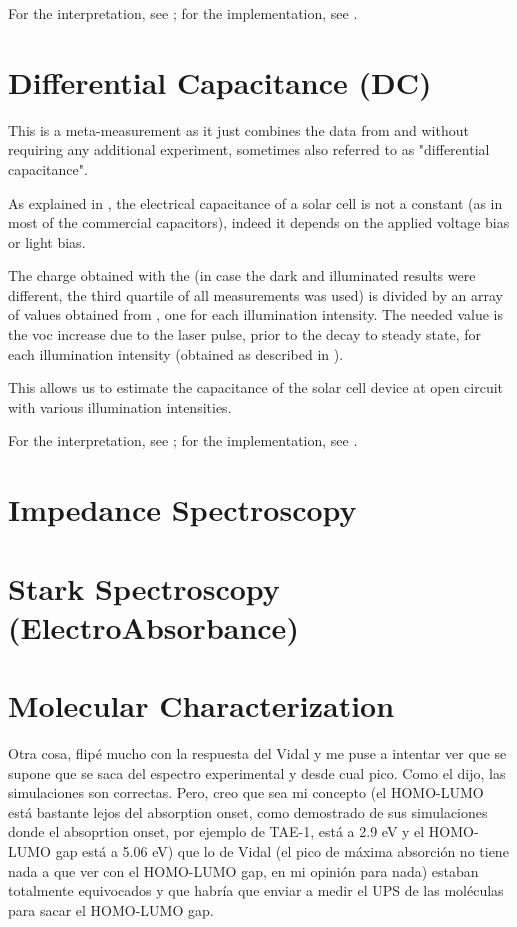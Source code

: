 For the interpretation, see ; for the implementation, see .

\section{Differential Capacitance (DC)}

This is a meta-measurement as it just combines the data from  and  without requiring any additional experiment\cite{Shuttle2008}, sometimes also referred to as "differential capacitance".

As explained in , the electrical capacitance of a solar cell is not a constant (as in most of the commercial capacitors), indeed it depends on the applied voltage bias or light bias.

The charge obtained with the  (in case the dark and illuminated results were different, the third quartile of all  measurements was used) is divided by an array of values obtained from , one for each illumination intensity. The needed value is the \gls{voc} increase due to the laser pulse, prior to the decay to steady state, for each illumination intensity (obtained as described in ).

This allows us to estimate the capacitance of the solar cell device at open circuit with various illumination intensities.

For the interpretation, see ; for the implementation, see .

\section{Impedance Spectroscopy}

\section{Stark Spectroscopy (ElectroAbsorbance)}

\section{Molecular Characterization}

Otra cosa, flipé mucho con la respuesta del Vidal y me puse a intentar
ver que se supone que se saca del espectro experimental y desde cual
pico. Como el dijo, las simulaciones son correctas.
Pero, creo que sea mi concepto (el HOMO-LUMO está bastante lejos del
absorption onset, como demostrado de sus simulaciones donde el
absoprtion onset, por ejemplo de TAE-1, está a 2.9 eV y el HOMO-LUMO gap
está a 5.06 eV) que lo de Vidal (el pico de máxima absorción no tiene
nada a que ver con el HOMO-LUMO gap, en mi opinión para nada) estaban
totalmente equivocados y que habría que enviar a medir el UPS de las
moléculas para sacar el HOMO-LUMO gap.

